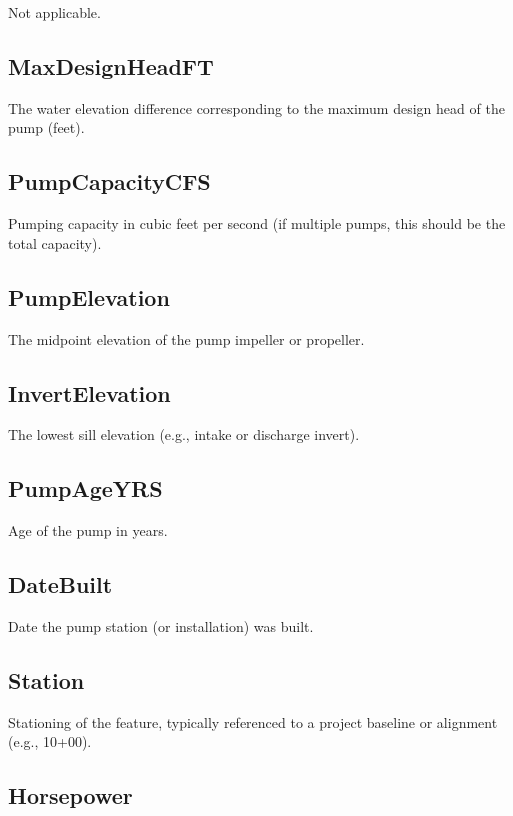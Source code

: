 \documentclass[
  letterpaper,
  DIV=11,
  numbers=noendperiod]{scrreprt}
\begin{document}
Not applicable.

\subsection{MaxDesignHeadFT}\label{maxdesignheadft}

The water elevation difference corresponding to the maximum design head
of the pump (feet).

\subsection{PumpCapacityCFS}\label{pumpcapacitycfs}

Pumping capacity in cubic feet per second (if multiple pumps, this
should be the total capacity).

\subsection{PumpElevation}\label{pumpelevation}

The midpoint elevation of the pump impeller or propeller.

\subsection{InvertElevation}\label{invertelevation}

The lowest sill elevation (e.g., intake or discharge invert).

\subsection{PumpAgeYRS}\label{pumpageyrs}

Age of the pump in years.

\subsection{DateBuilt}\label{datebuilt}

Date the pump station (or installation) was built.

\subsection{Station}\label{station}

Stationing of the feature, typically referenced to a project baseline or
alignment (e.g., 10+00).

\subsection{Horsepower}\label{horsepower}
\end{document}
